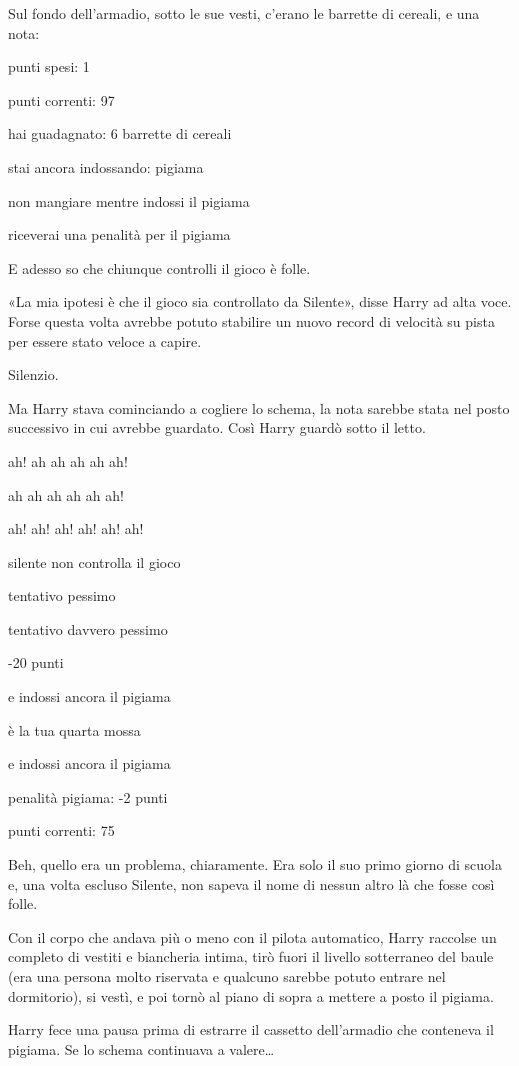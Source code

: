 Sul fondo dell’armadio, sotto le sue vesti, c’erano le barrette di cereali, e una nota:

punti spesi: 1

punti correnti: 97

hai guadagnato: 6 barrette di cereali

stai ancora indossando: pigiama

non mangiare mentre indossi il pigiama

riceverai una penalità per il pigiama

E adesso so che chiunque controlli il gioco è folle.

«La mia ipotesi è che il gioco sia controllato da Silente», disse Harry ad alta voce. Forse questa volta avrebbe potuto stabilire un nuovo record di velocità su pista per essere stato veloce a capire.

Silenzio.

Ma Harry stava cominciando a cogliere lo schema, la nota sarebbe stata nel posto successivo in cui avrebbe guardato. Così Harry guardò sotto il letto.

ah! ah ah ah ah ah!

ah ah ah ah ah ah!

ah! ah! ah! ah! ah! ah!

silente non controlla il gioco

tentativo pessimo

tentativo davvero pessimo

-20 punti

e indossi ancora il pigiama

è la tua quarta mossa

e indossi ancora il pigiama

penalità pigiama: -2 punti

punti correnti: 75

Beh, quello era un problema, chiaramente. Era solo il suo primo giorno di scuola e, una volta escluso Silente, non sapeva il nome di nessun altro là che fosse così folle.

Con il corpo che andava più o meno con il pilota automatico, Harry raccolse un completo di vestiti e biancheria intima, tirò fuori il livello sotterraneo del baule (era una persona molto riservata e qualcuno sarebbe potuto entrare nel dormitorio), si vestì, e poi tornò al piano di sopra a mettere a posto il pigiama.

Harry fece una pausa prima di estrarre il cassetto dell’armadio che conteneva il pigiama. Se lo schema continuava a valere…

